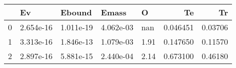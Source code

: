 \begin{tabular}{lllllrr}
\toprule
{} &         Ev &     Ebound &      Emass &     O &        Te &       Tr \\
\midrule
0 &  2.654e-16 &  1.011e-19 &  4.062e-03 &   nan &  0.046451 &  0.03706 \\
1 &  3.313e-16 &  1.846e-13 &  1.079e-03 &  1.91 &  0.147650 &  0.11570 \\
2 &  2.897e-16 &  5.881e-15 &  2.440e-04 &  2.14 &  0.673100 &  0.46180 \\
\bottomrule
\end{tabular}
